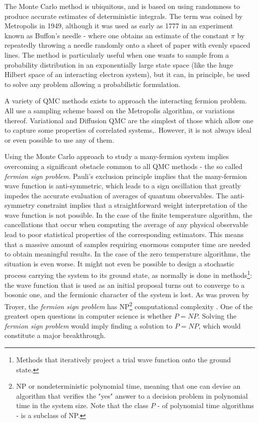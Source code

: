 The Monte Carlo method is ubiquitous, and is based on using randomness to produce accurate estimates of deterministic integrals.
The term was coined by Metropolis in 1949, although it was used as early as 1777 in an experiment known as Buffon's needle - where one obtains an estimate of the constant $\pi$ by repeatedly throwing a needle randomly onto a sheet of paper with evenly spaced lines. %
The method is particularly useful when one wants to sample from a probability distribution in an exponentially large state space (like the huge Hilbert space of an interacting electron system), but it can, in principle, be used to solve any problem allowing a probabilistic formulation.

A variety of \ac{QMC} methods exists to approach the interacting fermion problem.
All use a sampling scheme based on the Metropolis algorithm, or variations thereof.
Variational and Diffusion \ac{QMC} are the simplest of those which allow one to capture some properties of correlated systems,.
However, it is not always ideal or even possible to use any of them. 

Using the Monte Carlo approach to study a many-fermion system implies overcoming a significant obstacle common to all \ac{QMC} methods - the so called \emph{fermion sign problem}.
Pauli's exclusion principle implies that the many-fermion wave function is anti-symmetric, which leads to a sign oscillation that greatly impedes the accurate evaluation of averages of quantum observables.
The anti-symmetry constraint implies that a  straightforward weight interpretation of the wave function is not possible.
In the case of the finite temperature algorithm, the cancellations that occur when computing the average of any physical observable lead to poor statistical properties of the corresponding estimators.
This means that a massive amount of samples requiring enormous computer time are needed to obtain meaningful results.
In the case of the zero temperature algorithms, the situation is even worse.
It might not even be possible to design a stochastic process carrying the system to its ground state, as normally is done in  methods\footnote{Methods that iteratively project a trial wave function onto the ground state.}: the wave function that is used as an initial proposal turns out to converge to a bosonic one, and the fermionic character of the system is lost.
As was proven by Troyer, the \emph{fermion sign problem} has NP\footnote{NP or nondeterministic polynomial time, meaning that one can devise an algorithm that verifies the "yes" answer to a decision problem in polynomial time in the system size.
Note that the class $P$ - of polynomial time algorithms - is a subclass of NP.} computational complexity \cite{troyer_computational_2005}.
One of the greatest open questions in computer science is whether $P = NP$.
Solving the \emph{fermion sign problem} would imply finding a solution to $P = NP$, which would constitute a major breakthrough.

